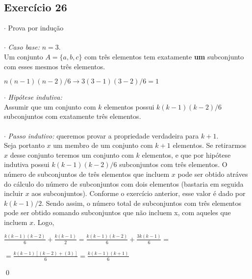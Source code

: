 \documentclass[12pt,a4paper]{article}
\begin{document}
\subsection*{Exercício 26}
$\cdot$ Prova por indução \\ \\
$\cdot$ \textit{Caso base:} $n=3$. \\ Um conjunto $A = \{a,b,c\}$ com três elementos tem exatamente \textbf{um} subconjunto com esses mesmos três elementos.
\begin{center}
$n(n-1)(n-2)/6 \to 3(3-1)(3-2)/6 = 1$
\end{center}
$\cdot$ \textit{Hipótese indutiva:} \\ Assumir que um conjunto com $k$ elementos possui $k(k-1)(k-2)/6$ subconjuntos com exatamente três elementos.\\ \\
$\cdot$ \textit{Passo indutivo:} queremos provar a propriedade verdadeira para $k+1$. \\
Seja portanto $x$ um membro de um conjunto com $k+1$ elementos. Se retirarmos $x$ desse conjunto teremos um conjunto com $k$ elementos, e que por hipótese indutiva possui $k(k-1)(k-2)/6$ subconjuntos com três elementos. O número de subconjuntos de três elementos que incluem $x$ pode ser obtido atráves do cálculo do número de subconjuntos com dois elementos (bastaria em seguida incluir $x$ aos subconjuntos). Conforme o exercício anterior, esse valor é dado por $k(k-1)/2$. Sendo assim, o número total de subconjuntos com três elementos pode ser obtido somando subconjuntos que não incluem x, com aqueles que incluem $x$. Logo,
\begin{center}
$\frac{k(k-1)(k-2)}{6} + \frac{k(k-1)}{2} = \frac{k(k-1)(k-2)}{6} + \frac{3k(k-1)}{6} = $
\end{center}
\begin{center}
$= \frac{k(k-1)[(k-2)+(3)]}{6} = \frac{k(k-1)(k+1)}{6}$
\end{center}
\qed
\end{document}
